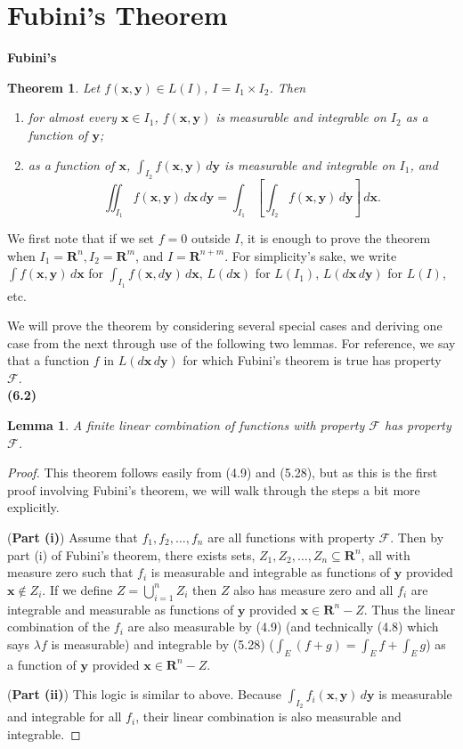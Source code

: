 \documentclass[12pt]{book}
\renewcommand{\vec}[1]{\mathbf{#1}}
\renewcommand{\cal}[1]{\mathscr{#1}}
\newcommand{\bu}{\bigcup}
\renewcommand{\ss}{\subseteq}
\newcommand{\cross}{\times}
\newcommand{\ee}{\end{enumerate}}
\newcommand{\bei}{\begin{enumerate}[label = (\roman*)]}
\newcommand{\R}{\mathbf{R}}
\renewcommand{\.}{\mkern1mu}
\newcounter{case}
\newenvironment{pf}{\begin{proof}\setlength{\parindent}{\normalparindent}\setlength{\parskip}{\normalparskip}}{\end{proof}}
\theoremstyle{theorem}
\newtheorem{theorem}{Theorem}
\newtheorem{lemma}{Lemma}
\newcommand{\thmindent}{\setlength{\parindent}{17pt}}
\newenvironment{thm}[1]
	{\noindent \textbf{#1}\hspace{2ex}\begin{minipage}[t]{\linewidth - \widthof{\textbf{(#1)}}}  \begin{theorem}\thmindent }
	{\end{theorem}\end{minipage}\medskip}
\newenvironment{lem}[1]
	{\noindent \textbf{#1}\hspace{2ex}\begin{minipage}[t]{\linewidth - \widthof{\textbf{(#1)}}}\begin{lemma}\thmindent }
	{\end{lemma}\end{minipage}\medskip}
\newlength{\normalparindent}
\newlength{\normalparskip}
\begin{document}
\section{Fubini's Theorem}
	\begin{thm}{Fubini's}
		Let $f(\vec x, \vec y) \in L(I)$, $I = I_1 \cross I_2$. Then 
		\bei
			\item for almost every $\vec x \in I_1$, $f(\vec x, \vec y)$ is measurable and integrable on $I_2$ as a function of $\vec y$;
			\item as a function of $\vec x$, $\int_{I_2} f(\vec x, \vec y)\, d\vec y$ is measurable and integrable on $I_1$, and 
				\[
					\iint_{I_1} f(\vec x, \vec y)\, d\vec x\, d\vec y = \int_{I_1} \left[\int_{I_2} f(\vec x, \vec y)\, d\vec y \right]\, d\vec x.
				\]
		\ee
	\end{thm}
	
	We first note that if we set $f=0$ outside $I$, it is enough to prove the theorem when $I_1 = \R^n, I_2 = \R^m$, and $I = \R^{n+m}$. For simplicity's sake, we write $\int f(\vec x, \vec y)\, d\vec x$ for $\int_{I_1} f(\vec x, d\vec y)\, d\vec x$, $L(d\vec x)$ for $L(I_1)$, $L(d\vec x\, d\vec y)$ for $L(I)$, etc.
		
	We will prove the theorem by considering several special cases and deriving one case from the next through use of the following two lemmas. For reference, we say that a function $f$ in $L(d\vec x\, d\vec y)$ for which Fubini's theorem is true has property $\cal F$.\\
	
	\begin{lem}{(6.2)}
		A finite linear combination of functions with property $\cal F$ has property $\cal F$.
	\end{lem}
		\begin{pf}
			This theorem follows easily from (4.9) and (5.28), but as this is the first proof involving Fubini's theorem, we will walk through the steps a bit more explicitly. 
			
			(\textbf{Part (i)}) Assume that $f_1, f_2, \ldots, f_n$ are all functions with property $\cal F$. Then by part (i) of Fubini's theorem, there exists sets, $Z_1, Z_2, \ldots, Z_n \ss \R^n$, all with measure zero such that $f_i$ is measurable and integrable as functions of $\vec y$ provided $\vec x \notin Z_i$. If we define $Z = \bu_{i=1}^n Z_i$ then $Z$ also has measure zero and all $f_i$ are integrable and measurable as functions of $\vec y$ provided $\vec x \in \R^n - Z$. Thus the linear combination of the $f_i$ are also measurable by (4.9) (and technically (4.8) which says $\lambda f$ is measurable) and integrable by (5.28) ($\int_E (f+g) = \int_E f + \int_E g$) as a function of $\vec y$ provided $\vec x\in \R^n-Z$.
			
			(\textbf{Part (ii)}) This logic is similar to above. Because $\int_{I_2} f_i(\vec x, \vec y)\, d\vec y$ is measurable and integrable for all $f_i$, their linear combination is also measurable and integrable.
		\end{pf}
	
\end{document}
